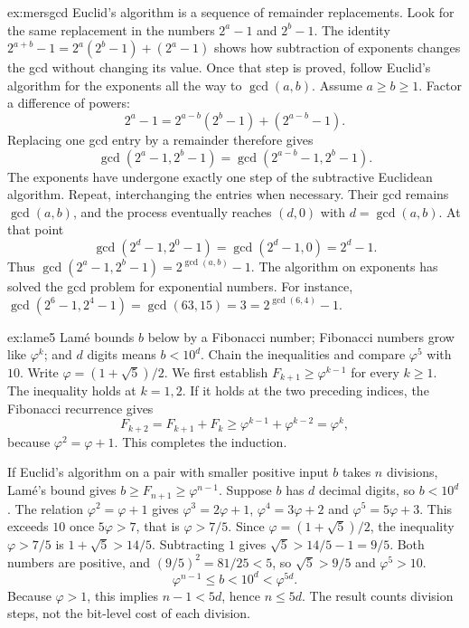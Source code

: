 \begin{solution}{ex:mersgcd}
\idea Euclid's algorithm is a sequence of remainder replacements. Look for the same replacement in the numbers $2^a-1$ and $2^b-1$. The identity $2^{a+b}-1=2^a(2^b-1)+(2^a-1)$ shows how subtraction of exponents changes the gcd without changing its value. Once that step is proved, follow Euclid's algorithm for the exponents all the way to $\gcd(a,b)$.
\writeup Assume $a\ge b\ge1$. Factor a difference of powers:
\[
2^a-1=2^{a-b}(2^b-1)+(2^{a-b}-1).
\]
Replacing one gcd entry by a remainder therefore gives
\[
\gcd(2^a-1,2^b-1)
=\gcd(2^{a-b}-1,2^b-1).
\]
The exponents have undergone exactly one step of the subtractive Euclidean algorithm. Repeat, interchanging the entries when necessary. Their gcd remains $\gcd(a,b)$, and the process eventually reaches $(d,0)$ with $d=\gcd(a,b)$. At that point
\[
\gcd(2^d-1,2^0-1)
=\gcd(2^d-1,0)=2^d-1.
\]
Thus $\gcd(2^a-1,2^b-1)=2^{\gcd(a,b)}-1$. The algorithm on exponents has solved the gcd problem for exponential numbers. For instance, $\gcd(2^6-1,2^4-1)=\gcd(63,15)=3=2^{\gcd(6,4)}-1$.
\end{solution}

\begin{solution}{ex:lame5}
\idea Lam\'e bounds $b$ below by a Fibonacci number; Fibonacci numbers grow like $\varphi^k$; and $d$ digits means $b<10^d$. Chain the inequalities and compare $\varphi^5$ with $10$.
\writeup Write $\varphi=(1+\sqrt5)/2$. We first establish $F_{k+1}\ge\varphi^{k-1}$ for every $k\ge1$. The inequality holds at $k=1,2$. If it holds at the two preceding indices, the Fibonacci recurrence gives
\[
F_{k+2}=F_{k+1}+F_k
\ge\varphi^{k-1}+\varphi^{k-2}
=\varphi^k,
\]
because $\varphi^2=\varphi+1$. This completes the induction.

If Euclid's algorithm on a pair with smaller positive input $b$ takes $n$ divisions, Lam\'e's bound gives
$b\ge F_{n+1}\ge\varphi^{n-1}$. Suppose $b$ has $d$ decimal digits, so $b<10^d$. The relation $\varphi^2=\varphi+1$ gives $\varphi^3=2\varphi+1$, $\varphi^4=3\varphi+2$ and $\varphi^5=5\varphi+3$. This exceeds $10$ once $5\varphi>7$, that is $\varphi>7/5$. Since $\varphi=(1+\sqrt5)/2$, the inequality $\varphi>7/5$ is $1+\sqrt5>14/5$. Subtracting $1$ gives $\sqrt5>14/5-1=9/5$. Both numbers are positive, and $(9/5)^2=81/25<5$, so $\sqrt5>9/5$ and $\varphi^5>10$.
\[
\varphi^{n-1}\le b<10^d<\varphi^{5d}.
\]
Because $\varphi>1$, this implies $n-1<5d$, hence $n\le5d$. The result counts division steps, not the bit-level cost of each division.
\end{solution}

